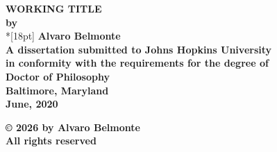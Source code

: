 \documentclass[12pt]{report}
\theoremstyle{definition}
\theoremstyle{remark}
\numberwithin{equation}{section}
\begin{document}
\newcommand{\bm}[1]{ \mbox{\boldmath $ #1 $} }
\newcommand{\bin}[2]{\left(\begin{array}{@{}c@{}} #1 \\ #2
             \end{array}\right) }
\renewcommand{\contentsname}{Table of Contents}
\baselineskip=24pt
 
\thispagestyle{empty}
\begin{center}
\vspace*{.25in}
{\bf\LARGE{ WORKING TITLE }}\\ %
\vspace*{.75in}
{\bf by} \\*[18pt]
\vspace*{.2in}
{\bf Alvaro Belmonte}\\ %
\vspace*{1in}
{\bf A dissertation submitted to Johns Hopkins University\\
in conformity with the requirements for the degree of\\
Doctor of Philosophy }\\
\vspace*{.75in}
{\bf Baltimore, Maryland} \\
{\bf June, 2020} \\     %
\vspace*{.5in}
\begin{small}
{\bf \copyright{ }2026 by Alvaro Belmonte} \\ %
{\bf All rights reserved}
\end{small}
\end{center}
\newpage 

\pagestyle{plain}
\setcounter{page}{2}





\pagestyle{plain}
\baselineskip=24pt
\tableofcontents
\listoftables
\listoffigures
\end{document}
